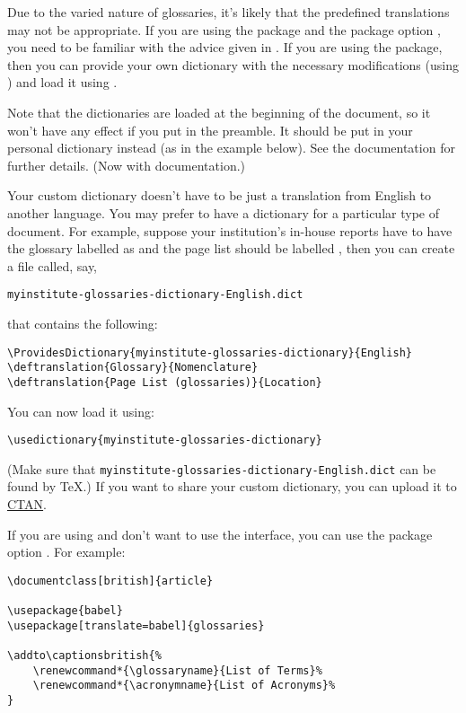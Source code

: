 \documentclass[report,inlinetitle]{nlctdoc}
\begin{document}
Due to the varied nature of glossaries, it's likely that the
predefined translations may not be appropriate. If you are using the
 package and the  package option , you need to be familiar with the advice given in
. If you are using the 
package, then you can provide your own dictionary with the necessary
modifications (using ) and load it using
.

\begin{important}
Note that the dictionaries are loaded at the beginning of the
document, so it won't have any effect if you put 
in the preamble. It should be put in your personal dictionary
instead (as in the example below). See the 
documentation for further details. (Now with 
documentation.)
\end{important}

Your custom dictionary doesn't have to be just a translation from
English to another language. You may prefer to have a dictionary for
a particular type of document. For example, suppose your
institution's in-house reports have to have the glossary labelled as
 and the page list should be labelled
, then you can create a file called, say,
\begin{verbatim}
myinstitute-glossaries-dictionary-English.dict
\end{verbatim}
that contains the following:
\begin{verbatim}
\ProvidesDictionary{myinstitute-glossaries-dictionary}{English}
\deftranslation{Glossary}{Nomenclature}
\deftranslation{Page List (glossaries)}{Location}
\end{verbatim}
You can now load it using:
\begin{verbatim}
\usedictionary{myinstitute-glossaries-dictionary}
\end{verbatim}
(Make sure that \texttt{myinstitute-glossaries-dictionary-English.dict}
can be found by \TeX.) If you want to share your custom dictionary,
you can upload it to \href{http://www.ctan.org/}{CTAN}.

If you are using  and don't want to use the
 interface, you can use the package
option . For example:
\begin{verbatim}
\documentclass[british]{article}

\usepackage{babel}
\usepackage[translate=babel]{glossaries}

\addto\captionsbritish{%
    \renewcommand*{\glossaryname}{List of Terms}%
    \renewcommand*{\acronymname}{List of Acronyms}%
}
\end{verbatim}
\end{document}

